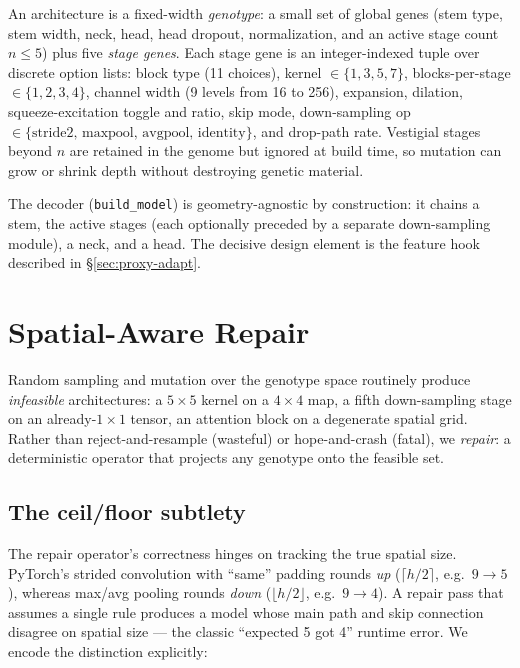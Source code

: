 \documentclass[10pt,twocolumn]{article}
\newcommand{\code}[1]{\texttt{\small #1}}
\begin{document}
An architecture is a fixed-width \emph{genotype}: a small set of global genes
(stem type, stem width, neck, head, head dropout, normalization, and an active
stage count $n\!\le\!5$) plus five \emph{stage genes}. Each stage gene is an
integer-indexed tuple over discrete option lists: block type (11 choices),
kernel $\in\{1,3,5,7\}$, blocks-per-stage $\in\{1,2,3,4\}$, channel width (9
levels from 16 to 256), expansion, dilation, squeeze-excitation toggle and
ratio, skip mode, down-sampling op $\in\{\text{stride2, maxpool, avgpool,
identity}\}$, and drop-path rate. Vestigial stages beyond $n$ are retained in
the genome but ignored at build time, so mutation can grow or shrink depth
without destroying genetic material.

The decoder (\code{build\_model}) is geometry-agnostic by construction: it
chains a stem, the active stages (each optionally preceded by a separate
down-sampling module), a neck, and a head. The decisive design element is the
feature hook described in \S\ref{sec:proxy-adapt}.

\section{Spatial-Aware Repair}
\label{sec:repair}

Random sampling and mutation over the genotype space routinely produce
\emph{infeasible} architectures: a $5{\times}5$ kernel on a $4{\times}4$ map, a
fifth down-sampling stage on an already-$1{\times}1$ tensor, an attention block
on a degenerate spatial grid. Rather than reject-and-resample (wasteful) or
hope-and-crash (fatal), we \emph{repair}: a deterministic operator that
projects any genotype onto the feasible set.

\subsection{The ceil/floor subtlety}
The repair operator's correctness hinges on tracking the true spatial size.
PyTorch's strided convolution with ``same'' padding rounds \emph{up}
($\lceil h/2\rceil$, e.g.\ $9\!\to\!5$), whereas max/avg pooling rounds
\emph{down} ($\lfloor h/2\rfloor$, e.g.\ $9\!\to\!4$). A repair pass that
assumes a single rule produces a model whose main path and skip connection
disagree on spatial size --- the classic ``expected 5 got 4'' runtime error.
We encode the distinction explicitly:
\end{document}
